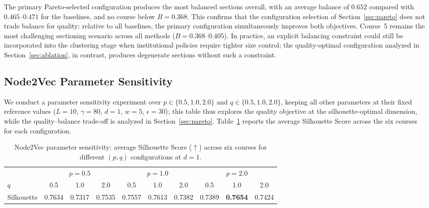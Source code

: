 \documentclass[pdflatex,sn-mathphys-num,iicol]{sn-jnl}%
\theoremstyle{thmstyleone}%
\theoremstyle{thmstyletwo}%
\theoremstyle{thmstylethree}%
\begin{document}
The primary Pareto-selected configuration produces the most balanced sections overall, with an average balance of $0.652$ compared with $0.465$--$0.471$ for the baselines, and no course below $B = 0.368$. This confirms that the configuration selection of Section~\ref{sec:pareto} does not trade balance for quality: relative to all baselines, the primary configuration simultaneously improves both objectives. Course~5 remains the most challenging sectioning scenario across all methods ($B = 0.368$--$0.405$). In practice, an explicit balancing constraint could still be incorporated into the clustering stage when institutional policies require tighter size control; the quality-optimal configuration analyzed in Section~\ref{sec:ablation}, in contrast, produces degenerate sections without such a constraint.

\subsection{Node2Vec Parameter Sensitivity}
\label{sec:sensitivity_n2v}

We conduct a parameter sensitivity experiment over $p\in\{0.5,1.0,2.0\}$ and $q\in\{0.5,1.0,2.0\}$, keeping all other parameters at their fixed reference values ($L{=}10$, $\gamma{=}80$, $d{=}1$, $w{=}5$, $\epsilon{=}30$); this table thus explores the quality objective at the silhouette-optimal dimension, while the quality--balance trade-off is analyzed in Section~\ref{sec:pareto}. Table~\ref{tab:n2v_sensitivity} reports the average Silhouette Score across the six courses for each configuration.

\begin{table}[t]
\centering
\caption{Node2Vec parameter sensitivity: average Silhouette Score ($\uparrow$) across six courses for different $(p,q)$ configurations at $d{=}1$.}
\label{tab:n2v_sensitivity}
\begin{tabular}{lccccccccc}
\toprule
& \multicolumn{3}{c}{$p=0.5$} & \multicolumn{3}{c}{$p=1.0$} & \multicolumn{3}{c}{$p=2.0$} \\
\cmidrule(lr){2-4}\cmidrule(lr){5-7}\cmidrule(lr){8-10}
$q$ & 0.5 & 1.0 & 2.0 & 0.5 & 1.0 & 2.0 & 0.5 & 1.0 & 2.0 \\
\midrule
Silhouette & 0.7634 & 0.7317 & 0.7535 & 0.7557 & 0.7613 & 0.7382 & 0.7389 & \textbf{0.7654} & 0.7424 \\
\bottomrule
\end{tabular}
\end{table}
\end{document}
